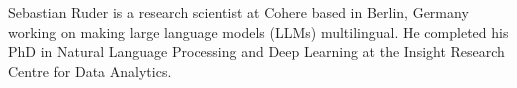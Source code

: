 Sebastian Ruder is a research scientist at Cohere based in Berlin, Germany working on making large language models (LLMs) multilingual.
He completed his PhD in Natural Language Processing and Deep Learning at the Insight Research Centre for Data Analytics.
